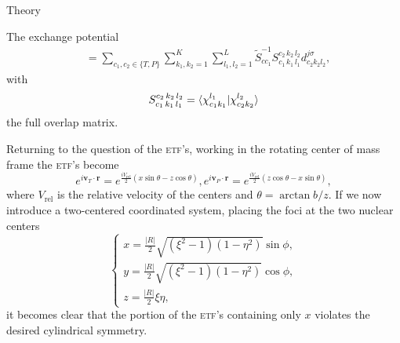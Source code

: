 \documentclass[aps, pra, reprint, groupedaddress, amsfonts,
               amsmath, amssymb, showpacs, nofootinbib]{revtex4-1}
\begin{document}
\begin{section}{Theory \label{sec:theory}}
\begin{subsection}{The exchange potential \label{sec:xpot}}
\begin{equation}
\begin{split}
                           & = \sum\limits_{c_1, c_2 \in \{T,P\}} \sum\limits_{k_1, k_2 = 1}^K
                               \sum\limits_{l_1, l_2 = 1}^L \tilde{S}^{-1}_{c c_1}
                               S_{c_1 \, k_1 \, l_1 }^{c_2 \, k_2 \, l_2 } d^{j \sigma}_{c_2 k_2 l_2},
         \end{split}
      \end{equation}
      with
      \begin{equation} \label{eq:overlap}
         S_{c_1 \, k_1 \, l_1 }^{c_2 \, k_2 \, l_2 } =
            \braket{ \chi^{l_1}_{c_1 k_1} | \chi^{l_2}_{c_2 k_2} }
      \end{equation}
      the full overlap matrix.

      Returning to the question of the \textsc{etf}'s, working in the rotating center of mass frame the
      \textsc{etf}'s become
      \begin{subequations} \label{eq:etf}
         \begin{equation} \label{eq:etfT}
            e^{i \mathbf{v}_T \cdot \mathbf{r}} =
             e^{\frac{i V_\mathrm{rel}}{2} (x \sin \theta - z \cos \theta)},
         \end{equation}
         \begin{equation} \label{eq:etfP}
            e^{i \mathbf{v}_P \cdot \mathbf{r}} =
             e^{\frac{i V_\mathrm{rel}}{2} (z \cos \theta - x \sin \theta)},
         \end{equation}
      \end{subequations}
      where $V_\mathrm{rel}$ is the relative velocity of the centers and $\theta = \arctan b/z$. If we
      now introduce a two-centered coordinated system, placing the foci at the two nuclear centers
      \begin{equation} \label{eq:psc}
            \left\{
            \begin{array}{l}
               x = \frac{|R|}{2} \sqrt{(\xi^2 - 1)(1 - \eta^2)} \sin \phi, \\ [2ex]
               y = \frac{|R|}{2} \sqrt{(\xi^2 - 1)(1 - \eta^2)} \cos \phi, \\ [2ex]
               z = \frac{|R|}{2} \xi \eta,
            \end{array}
            \right.
      \end{equation}
      it becomes clear that the portion of the \textsc{etf}'s containing only $x$ violates the desired
      cylindrical symmetry.


\end{subsection}
\end{section}
\end{document}
